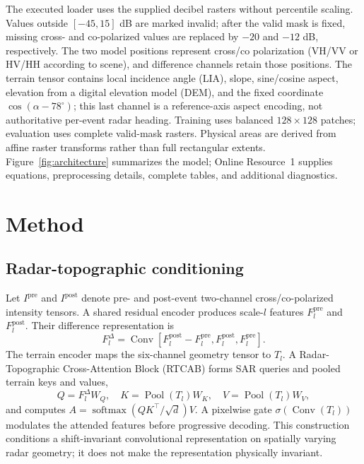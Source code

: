 \documentclass[referee,lineno,pdflatex,sn-apa]{sn-jnl}
\begin{document}
The executed loader uses the supplied decibel rasters without percentile scaling. Values outside $[-45,15]$ dB are marked invalid; after the valid mask is fixed, missing cross- and co-polarized values are replaced by $-20$ and $-12$ dB, respectively. The two model positions represent cross/co polarization (VH/VV or HV/HH according to scene), and difference channels retain those positions. The terrain tensor contains local incidence angle (LIA), slope, sine/cosine aspect, elevation from a digital elevation model (DEM), and the fixed coordinate $\cos(\alpha-78^\circ)$; this last channel is a reference-axis aspect encoding, not authoritative per-event radar heading. Training uses balanced $128\times128$ patches; evaluation uses complete valid-mask rasters. Physical areas are derived from affine raster transforms rather than full rectangular extents. Figure~\ref{fig:architecture} summarizes the model; Online Resource~1 supplies equations, preprocessing details, complete tables, and additional diagnostics.

\section{Method}

\subsection{Radar-topographic conditioning}

Let $I^{\mathrm{pre}}$ and $I^{\mathrm{post}}$ denote pre- and post-event two-channel cross/co-polarized intensity tensors. A shared residual encoder produces scale-$l$ features $F_l^{\mathrm{pre}}$ and $F_l^{\mathrm{post}}$. Their difference representation is
\begin{equation}
F_l^{\Delta}=\operatorname{Conv}\!\left[
F_l^{\mathrm{post}}-F_l^{\mathrm{pre}},
F_l^{\mathrm{post}},
F_l^{\mathrm{pre}}\right].
\end{equation}
The terrain encoder maps the six-channel geometry tensor to $T_l$. A Radar-Topographic Cross-Attention Block (RTCAB) forms SAR queries and pooled terrain keys and values,
\begin{equation}
Q=F_l^{\Delta}W_Q,\quad K=\operatorname{Pool}(T_l)W_K,\quad
V=\operatorname{Pool}(T_l)W_V,
\end{equation}
and computes $A=\operatorname{softmax}(QK^\top/\sqrt{d})V$. A pixelwise gate $\sigma(\operatorname{Conv}(T_l))$ modulates the attended features before progressive decoding. This construction conditions a shift-invariant convolutional representation on spatially varying radar geometry; it does not make the representation physically invariant.
\end{document}
